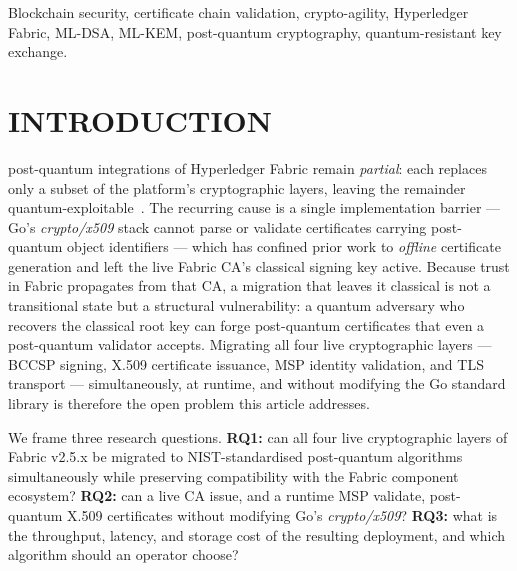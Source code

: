 \documentclass{ieeetj}
\begin{document}
\begin{IEEEkeywords}
{Blockchain security, certificate chain validation, crypto-agility,
Hyperledger Fabric, ML-DSA, ML-KEM, post-quantum cryptography, quantum-resistant
key exchange.}
\end{IEEEkeywords}

\maketitle

\section{INTRODUCTION} \label{sec:intro}
 post-quantum integrations of Hyperledger Fabric
remain \emph{partial}: each replaces only a subset of the platform's
cryptographic layers, leaving the remainder
quantum-exploitable~\cite{holcomb2021, hu2025prototype, abbas2025, kasula2025, razdan2025postquantum}.
The recurring cause is a single implementation barrier --- Go's
\textit{crypto/x509} stack cannot parse or validate certificates
carrying post-quantum object identifiers --- which has confined prior
work to \emph{offline} certificate generation and left the live Fabric
CA's classical signing key active. Because trust in Fabric propagates
from that CA, a migration that leaves it classical is not a transitional
state but a structural vulnerability: a quantum adversary who recovers
the classical root key can forge post-quantum certificates that even a
post-quantum validator accepts. Migrating all four live cryptographic
layers --- BCCSP signing, X.509 certificate issuance, MSP identity
validation, and TLS transport --- simultaneously, at runtime, and
without modifying the Go standard library is therefore the open problem
this article addresses.

We frame three research questions. \textbf{RQ1:} can all four live
cryptographic layers of Fabric v2.5.x be migrated to NIST-standardised
post-quantum algorithms simultaneously while preserving compatibility
with the Fabric component ecosystem? \textbf{RQ2:} can a live CA issue,
and a runtime MSP validate, post-quantum X.509 certificates without
modifying Go's \textit{crypto/x509}? \textbf{RQ3:} what is the
throughput, latency, and storage cost of the resulting deployment, and
which algorithm should an operator choose?
\end{document}
